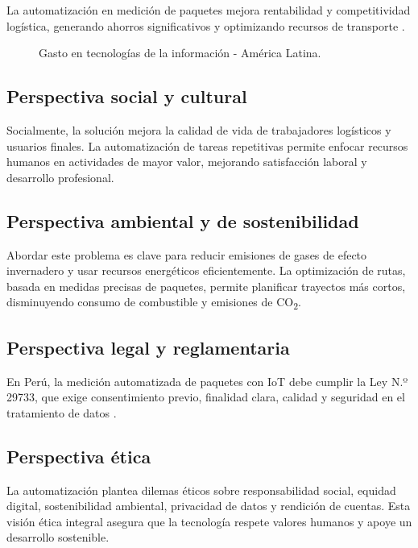 La automatización en medición de paquetes mejora rentabilidad y competitividad logística, generando ahorros significativos y optimizando recursos de transporte \cite{Krysiska2024}.

\begin{figure}[H]
    \centering
    \caption{Gasto en tecnologías de la información - América Latina.}
    \label{fig:gastos_tecnologia}
\end{figure}

\subsection{Perspectiva social y cultural}

Socialmente, la solución mejora la calidad de vida de trabajadores logísticos y usuarios finales. La automatización de tareas repetitivas permite enfocar recursos humanos en actividades de mayor valor, mejorando satisfacción laboral y desarrollo profesional.

\subsection{Perspectiva ambiental y de sostenibilidad}
Abordar este problema es clave para reducir emisiones de gases de efecto invernadero y usar recursos energéticos eficientemente. La optimización de rutas, basada en medidas precisas de paquetes, permite planificar trayectos más cortos, disminuyendo consumo de combustible y emisiones de CO\textsubscript{2}.

\subsection{Perspectiva legal y reglamentaria}

En Perú, la medición automatizada de paquetes con IoT debe cumplir la Ley N.º 29733, que exige consentimiento previo, finalidad clara, calidad y seguridad en el tratamiento de datos \cite{EditoraPer2973}.

\subsection{Perspectiva ética}

La automatización plantea dilemas éticos sobre responsabilidad social, equidad digital, sostenibilidad ambiental, privacidad de datos y rendición de cuentas. Esta visión ética integral asegura que la tecnología respete valores humanos y apoye un desarrollo sostenible.

